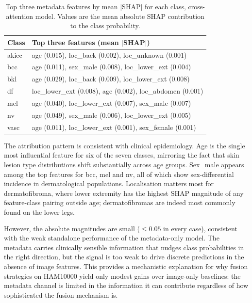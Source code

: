 \documentclass[conference]{IEEEtran}
\begin{document}
\begin{table}[htbp]
\caption{Top three metadata features by mean $|$SHAP$|$ for each class, cross-attention model. Values are the mean absolute SHAP contribution to the class probability.}
\label{tab:shap}
\centering
\small
\begin{tabular}{ll}
\toprule
\textbf{Class} & \textbf{Top three features (mean $|$SHAP$|$)} \\
\midrule
akiec & age (0.015), loc\_back (0.002), loc\_unknown (0.001) \\
bcc   & age (0.011), sex\_male (0.008), loc\_lower\_ext (0.004) \\
bkl   & age (0.029), loc\_back (0.009), loc\_lower\_ext (0.008) \\
df    & loc\_lower\_ext (0.008), age (0.002), loc\_abdomen (0.001) \\
mel   & age (0.040), loc\_lower\_ext (0.007), sex\_male (0.007) \\
nv    & age (0.049), sex\_male (0.006), loc\_lower\_ext (0.005) \\
vasc  & age (0.011), loc\_lower\_ext (0.001), sex\_female (0.001) \\
\bottomrule
\end{tabular}
\end{table}

The attribution pattern is consistent with clinical epidemiology. Age is the single most influential feature for six of the seven classes, mirroring the fact that skin lesion type distributions shift substantially across age groups. Sex\_male appears among the top features for bcc, mel and nv, all of which show sex-differential incidence in dermatological populations. Localisation matters most for dermatofibroma, where lower extremity has the highest SHAP magnitude of any feature-class pairing outside age; dermatofibromas are indeed most commonly found on the lower legs.

However, the absolute magnitudes are small ($\leq 0.05$ in every case), consistent with the weak standalone performance of the metadata-only model. The metadata carries clinically sensible information that nudges class probabilities in the right direction, but the signal is too weak to drive discrete predictions in the absence of image features. This provides a mechanistic explanation for why fusion strategies on HAM10000 yield only modest gains over image-only baselines: the metadata channel is limited in the information it can contribute regardless of how sophisticated the fusion mechanism is.
\end{document}
